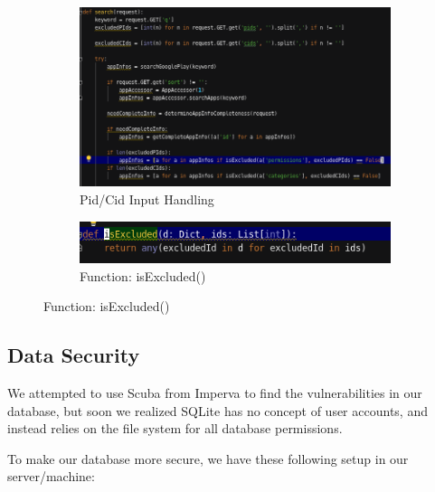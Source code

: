 \documentclass[12pt, a4paper]{article}
\begin{document}
\begin{figure}[H]
\begin{subfigure}
\centering
\includegraphics[width=\textwidth]{pidcidhandle.png}
\caption{Pid/Cid Input Handling}
\end{subfigure}
\begin{subfigure}
\centering
\includegraphics[width=\textwidth]{isExcluded.png}
\caption{Function: isExcluded()}
\end{subfigure}
\label{fig:pidcidhandle}
\end{figure}

\subsection{Data Security}
We attempted to use Scuba from Imperva to find the vulnerabilities in our database, but soon we realized SQLite has no concept of user accounts, and instead relies on the file system for all database permissions.

To make our database more secure, we have these following setup in our server/machine:
\end{document}
